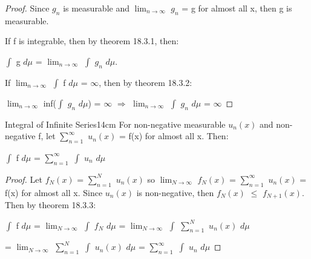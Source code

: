     \begin{proof}
        Since $g_n$ is measurable and $\lim_{n \rightarrow \infty}$ $g_n$ = g
        for almost all x, then g is measurable.

        If f is integrable, then by {\color{red} theorem 18.3.1}, then:
        
        \hspace{0.5cm}
        $\int$ g $d\mu$ = $\lim_{n \rightarrow \infty}$ $\int$ $g_n$ $d\mu$.

        If $\lim_{n \rightarrow \infty}$ $\int$ f $d\mu$ = $\infty$,
        then by {\color{red} theorem 18.3.2}:

        \hspace{0.5cm}
        $\lim_{n \rightarrow \infty}$ inf($\int$ $g_n$ $d\mu$) = $\infty$
        \hspace{0.5cm}
        $\Rightarrow$
        \hspace{0.5cm}
        $\lim_{n \rightarrow \infty}$ $\int$ $g_n$ $d\mu$ = $\infty$
    \end{proof}

    \vspace{0.5cm}



    \begin{corollary}{Integral of Infinite Series}{14cm}
        For non-negative measurable $u_n(x)$ and non-negative f,
        let $\sum_{n=1}^{\infty}$ $u_n(x)$ = f(x) for almost all x. Then:

        \hspace{0.5cm}
        $\int$ f $d\mu$ = $\sum_{n=1}^{\infty}$ $\int$ $u_n$ $d\mu$
    \end{corollary}

    \begin{proof}
        Let $f_N(x)$ = $\sum_{n=1}^N$ $u_n(x)$ so
        $\lim_{N \rightarrow \infty}$ $f_N(x)$
        = $\sum_{n=1}^{\infty}$ $u_n(x)$ = f(x) for almost all x.
        Since $u_n(x)$ is non-negative, then $f_N(x)$ $\leq$ $f_{N+1}(x)$.
        Then by {\color{red} theorem 18.3.3}:

        \hspace{0.5cm}
        $\int$ f $d\mu$
        = $\lim_{N \rightarrow \infty}$ $\int$ $f_N$ $d\mu$
        = $\lim_{N \rightarrow \infty}$ $\int$ $\sum_{n=1}^N$ $u_n(x)$ $d\mu$

        \hspace{1.8cm}
        = $\lim_{N \rightarrow \infty}$ $\sum_{n=1}^N$ $\int$ $u_n(x)$ $d\mu$
        = $\sum_{n=1}^{\infty}$ $\int$ $u_n$ $d\mu$
    \end{proof}

